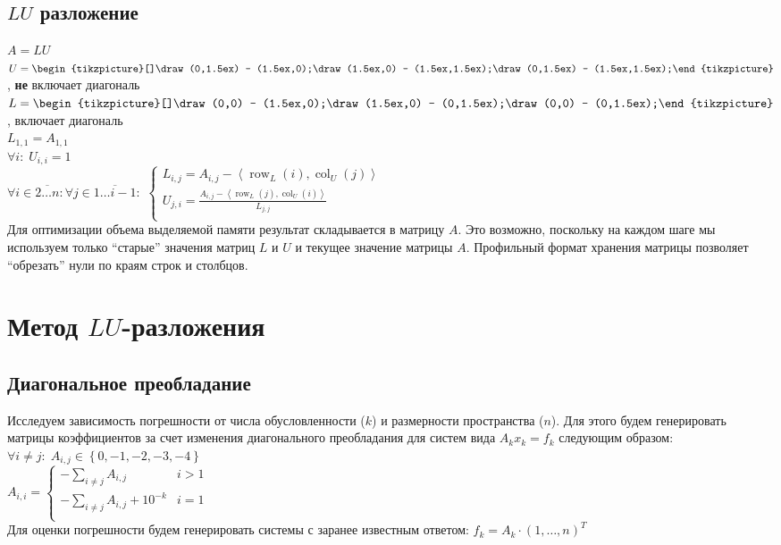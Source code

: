 \documentclass[russian, english]{article}
\newcommand{\mydot}[2]{\left\langle#1,#2\right\rangle}
\begin{document}
\subsection{$LU$ разложение}

\def\opn#1{\operatorname{#1}}
\newcommand{\mtop}[1]{%
\begin{tikzpicture}[#1]%
\draw (0,1.5ex) -- (1.5ex,0);%
\draw (1.5ex,0) -- (1.5ex,1.5ex);%
\draw (0,1.5ex) -- (1.5ex,1.5ex);%
\end{tikzpicture}%
}

\newcommand{\mbottom}[1]{%
\begin{tikzpicture}[#1]%
\draw (0,0) -- (1.5ex,0);%
\draw (1.5ex,0) -- (0,1.5ex);%
\draw (0,0) -- (0,1.5ex);%
\end{tikzpicture}%
}

$A=LU$\\
$U = \mtop{}$, \textbf{не} включает диагональ\\
$L = \mbottom{}$, включает диагональ\\
$L_{1, 1} = A_{1, 1}$\\
$\forall i:\; U_{i, i} = 1$\\
$\forall i\in\overline{2\dots n}: \forall j\in\overline{1\dots i-1}:$
$\begin{cases}
	L_{i,j} = A_{i, j} - \mydot{\opn{row}_L(i)}{\opn{col}_U(j)}\\
	U_{j,i} = \frac{A_{i, j} - \mydot{\opn{row}_L(j)}{\opn{col}_U(i)}}{L_{j, j}}\\
\end{cases}$\\

Для оптимизации объема выделяемой памяти результат складывается в матрицу $A$. Это возможно, поскольку на каждом шаге мы используем только ``старые'' значения матриц $L$ и $U$ и текущее значение матрицы $A$. Профильный формат хранения матрицы позволяет ``обрезать'' нули по краям строк и столбцов.

\section{Метод $LU$-разложения}
\subsection{Диагональное преобладание}
\label{DiagonalPrMatrix0}
Исследуем зависимость погрешности от числа обусловленности ($k$) и размерности пространства ($n$). Для этого будем генерировать матрицы коэффициентов за счет изменения диагонального преобладания для систем вида $A_kx_k=f_k$ следующим образом:\\
$\forall i\neq j:\; A_{i, j}\in\left\{0, -1, -2, -3, -4\right\}$\\
$A_{i,i}=\begin{cases}
-\sum_{i\neq j}A_{i, j} & i > 1\\
-\sum_{i\neq j}A_{i, j} + 10^{-k} & i = 1\\
\end{cases}$\\
Для оценки погрешности будем генерировать системы с заранее известным ответом: $f_k=A_k\cdot (1,\dots,n)^T$\\
\end{document}
